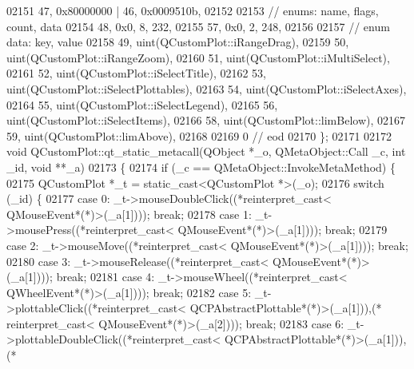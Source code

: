 \begin{DoxyCode}
02151       47, 0x80000000 | 46, 0x0009510b,
02152 
02153  \textcolor{comment}{// enums: name, flags, count, data}
02154       48, 0x0,    8,  232,
02155       57, 0x0,    2,  248,
02156 
02157  \textcolor{comment}{// enum data: key, value}
02158       49, uint(QCustomPlot::iRangeDrag),
02159       50, uint(QCustomPlot::iRangeZoom),
02160       51, uint(QCustomPlot::iMultiSelect),
02161       52, uint(QCustomPlot::iSelectTitle),
02162       53, uint(QCustomPlot::iSelectPlottables),
02163       54, uint(QCustomPlot::iSelectAxes),
02164       55, uint(QCustomPlot::iSelectLegend),
02165       56, uint(QCustomPlot::iSelectItems),
02166       58, uint(QCustomPlot::limBelow),
02167       59, uint(QCustomPlot::limAbove),
02168 
02169        0        \textcolor{comment}{// eod}
02170 \};
02171 
02172 \textcolor{keywordtype}{void} QCustomPlot::qt\_static\_metacall(QObject *\_o, QMetaObject::Call \_c, \textcolor{keywordtype}{int} \_id, \textcolor{keywordtype}{void} **\_a)
02173 \{
02174     \textcolor{keywordflow}{if} (\_c == QMetaObject::InvokeMetaMethod) \{
02175         QCustomPlot *\_t = \textcolor{keyword}{static\_cast<}QCustomPlot *\textcolor{keyword}{>}(\_o);
02176         \textcolor{keywordflow}{switch} (\_id) \{
02177         \textcolor{keywordflow}{case} 0: \_t->mouseDoubleClick((*\textcolor{keyword}{reinterpret\_cast<} QMouseEvent*(*)\textcolor{keyword}{>}(\_a[1]))); \textcolor{keywordflow}{break};
02178         \textcolor{keywordflow}{case} 1: \_t->mousePress((*\textcolor{keyword}{reinterpret\_cast<} QMouseEvent*(*)\textcolor{keyword}{>}(\_a[1]))); \textcolor{keywordflow}{break};
02179         \textcolor{keywordflow}{case} 2: \_t->mouseMove((*\textcolor{keyword}{reinterpret\_cast<} QMouseEvent*(*)\textcolor{keyword}{>}(\_a[1]))); \textcolor{keywordflow}{break};
02180         \textcolor{keywordflow}{case} 3: \_t->mouseRelease((*\textcolor{keyword}{reinterpret\_cast<} QMouseEvent*(*)\textcolor{keyword}{>}(\_a[1]))); \textcolor{keywordflow}{break};
02181         \textcolor{keywordflow}{case} 4: \_t->mouseWheel((*\textcolor{keyword}{reinterpret\_cast<} QWheelEvent*(*)\textcolor{keyword}{>}(\_a[1]))); \textcolor{keywordflow}{break};
02182         \textcolor{keywordflow}{case} 5: \_t->plottableClick((*\textcolor{keyword}{reinterpret\_cast<} QCPAbstractPlottable*(*)\textcolor{keyword}{>}(\_a[1])),(*\textcolor{keyword}{
      reinterpret\_cast<} QMouseEvent*(*)\textcolor{keyword}{>}(\_a[2]))); \textcolor{keywordflow}{break};
02183         \textcolor{keywordflow}{case} 6: \_t->plottableDoubleClick((*\textcolor{keyword}{reinterpret\_cast<} QCPAbstractPlottable*(*)\textcolor{keyword}{>}(\_a[1])),(*\textcolor{keyword}{
}
\end{DoxyCode}
